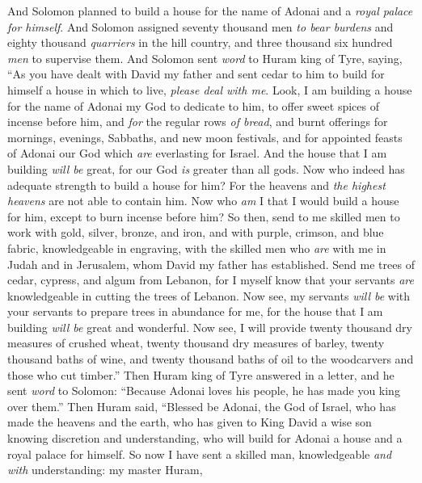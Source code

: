 \begin{biblechapter} %
  And Solomon planned to build a house for the name of Adonai and a \textit{royal palace for himself}.
\verse And Solomon assigned seventy thousand men \textit{to bear burdens} and eighty thousand \textit{quarriers} in the hill country, and three thousand six hundred \textit{men} to supervise them.
\verse And Solomon sent \textit{word} to Huram king of Tyre, saying, “As you have dealt with David my father and sent cedar to him to build for himself a house in which to live, \textit{please deal with me}.
\verse Look, I am building a house for the name of Adonai my God to dedicate to him, to offer sweet spices of incense before him, and \textit{for} the regular rows \textit{of bread}, and burnt offerings for mornings, evenings, Sabbaths, and new moon festivals, and for appointed feasts of Adonai our God which \textit{are} everlasting for Israel.
\verse And the house that I am building \textit{will be} great, for our God \textit{is} greater than all gods.
\verse Now who indeed has adequate strength to build a house for him? For the heavens and \textit{the highest heavens} are not able to contain him. Now who \textit{am} I that I would build a house for him, except to burn incense before him?
\verse So then, send to me skilled men to work with gold, silver, bronze, and iron, and with purple, crimson, and blue fabric, knowledgeable in engraving, with the skilled men who \textit{are} with me in Judah and in Jerusalem, whom David my father has established.
\verse Send me trees of cedar, cypress, and algum from Lebanon, for I myself know that your servants \textit{are} knowledgeable in cutting the trees of Lebanon. Now see, my servants \textit{will be} with your servants
\verse to prepare trees in abundance for me, for the house that I am building \textit{will be} great and wonderful.
\verse Now see, I will provide twenty thousand dry measures of crushed wheat, twenty thousand dry measures of barley, twenty thousand baths of wine, and twenty thousand baths of oil to the woodcarvers and those who cut timber.”
\verse Then Huram king of Tyre answered in a letter, and he sent \textit{word} to Solomon: “Because Adonai loves his people, he has made you king over them.”
\verse Then Huram said, “Blessed be Adonai, the God of Israel, who has made the heavens and the earth, who has given to King David a wise son knowing discretion and understanding, who will build for Adonai a house and a royal palace for himself.
\verse So now I have sent a skilled man, knowledgeable \textit{and with} understanding: my master Huram,

\end{biblechapter}

